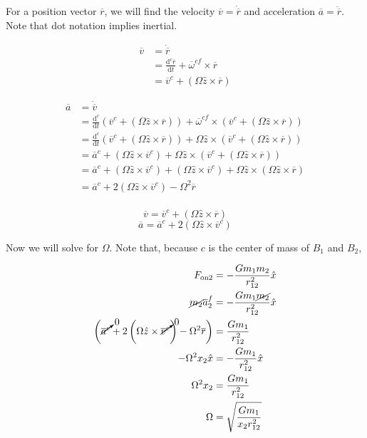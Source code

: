 \documentclass{article}
\newcommand{\dd}[2]{\frac{\mathrm{d}#1}{\mathrm{d}#2}}
\newcommand{\vv}[1]{\overline{#1}}
\begin{document}
For a position vector $\vv{r}$, we will find the velocity $\vv{v}=\dot{\vv{r}}$ and acceleration $\vv{a}=\ddot{\vv{r}}$. Note that dot notation implies inertial. 

\[
\begin{aligned}
    \vv{v}&=\dot{\vv{r}}\\
    &=\dd{^c\vv{r}}{t}+\vv{\omega}^{cf}\times\vv{r}\\
    &=\vv{v}^c+\left(\Omega\hat{z}\times\vv{r}\right)
\end{aligned}
\]

\[
\begin{aligned}
    \vv{a}&=\dot{\vv{v}}\\
    &=\dd{^c}{t}\left(\vv{v}^c+\left(\Omega\hat{z}\times\vv{r}\right)\right)+\vv{\omega}^{cf}\times\left(\vv{v}^c+\left(\Omega\hat{z}\times\vv{r}\right)\right)\\
    &=\dd{^c}{t}\left(\vv{v}^c+\left(\Omega\hat{z}\times\vv{r}\right)\right)+\Omega\hat{z}\times\left(\vv{v}^c+\left(\Omega\hat{z}\times\vv{r}\right)\right)\\
    &=\vv{a}^c+\left(\Omega\hat{z}\times\vv{v}^c\right)+\Omega\hat{z}\times\left(\vv{v}^c+\left(\Omega\hat{z}\times\vv{r}\right)\right)\\
    &=\vv{a}^c+\left(\Omega\hat{z}\times\vv{v}^c\right)+\left(\Omega\hat{z}\times\vv{v}^c\right)+\Omega\hat{z}\times\left(\Omega\hat{z}\times\vv{r}\right)\\
    &=\vv{a}^c+2\left(\Omega\hat{z}\times\vv{v}^c\right)-\Omega^2\vv{r}\\
\end{aligned}
\]

\[\boxed{\vv{v}=\vv{v}^c+\left(\Omega\hat{z}\times\vv{r}\right)}\]
\[\boxed{\vv{a}=\vv{a}^c+2\left(\Omega\hat{z}\times\vv{v}^c\right)}\]

Now we will solve for $\Omega$. Note that, because $c$ is the center of mass of $B_1$ and $B_2$, 

\[\begin{aligned}
    F_{\text{on2}}&=-\frac{Gm_1m_2}{r_{12}^2}\hat{x}\\
    \cancel{m_2}\vv{a}_2^f&=-\frac{Gm_1\cancel{m_2}}{r_{12}^2}\hat{x}\\
    \left(\cancelto{0}{\vv{a}^c}+2\left(\Omega\hat{z}\times\cancelto{0}{\vv{v}^c}\right)-\Omega^2\vv{r}\right)&=\frac{Gm_1}{r_{12}^2}\\
    -\Omega^2x_2\hat{x}&=-\frac{Gm_1}{r_{12}^2}\hat{x}\\
    \Omega^2x_2&=\frac{Gm_1}{r_{12}^2}\\
    \Omega&=\sqrt{\frac{Gm_1}{x_2r_{12}^2}}\\
\end{aligned}\]
\end{document}
